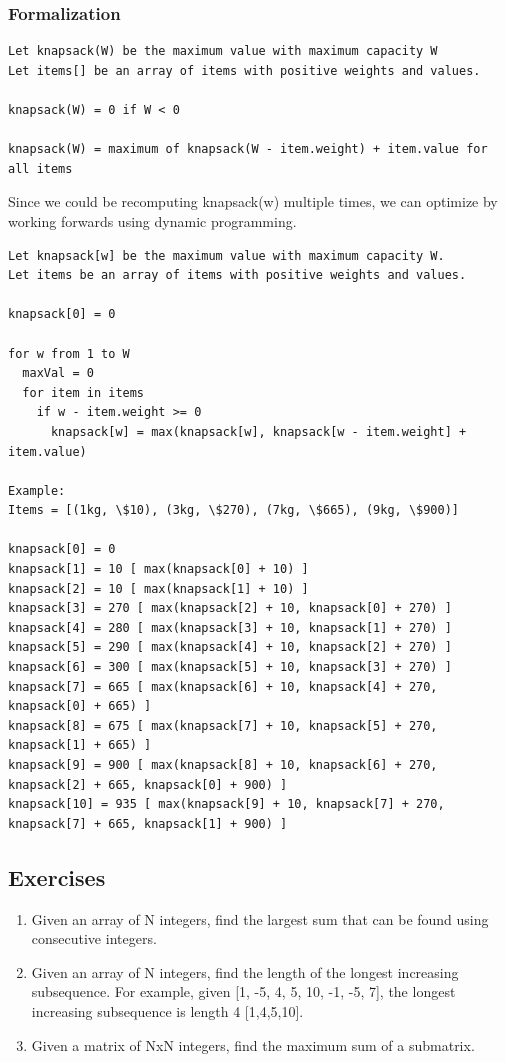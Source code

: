 \documentclass[11pt,oneside]{book}
\begin{document}
\subsubsection{Formalization}

\begin{lstlisting}
Let knapsack(W) be the maximum value with maximum capacity W
Let items[] be an array of items with positive weights and values.

knapsack(W) = 0 if W < 0

knapsack(W) = maximum of knapsack(W - item.weight) + item.value for all items
\end{lstlisting}

Since we could be recomputing knapsack(w) multiple times, we can optimize by working forwards using dynamic programming.

\begin{lstlisting}
Let knapsack[w] be the maximum value with maximum capacity W.
Let items be an array of items with positive weights and values.

knapsack[0] = 0

for w from 1 to W
  maxVal = 0
  for item in items
    if w - item.weight >= 0
      knapsack[w] = max(knapsack[w], knapsack[w - item.weight] + item.value)

Example:
Items = [(1kg, \$10), (3kg, \$270), (7kg, \$665), (9kg, \$900)]

knapsack[0] = 0
knapsack[1] = 10 [ max(knapsack[0] + 10) ]
knapsack[2] = 10 [ max(knapsack[1] + 10) ]
knapsack[3] = 270 [ max(knapsack[2] + 10, knapsack[0] + 270) ]
knapsack[4] = 280 [ max(knapsack[3] + 10, knapsack[1] + 270) ]
knapsack[5] = 290 [ max(knapsack[4] + 10, knapsack[2] + 270) ]
knapsack[6] = 300 [ max(knapsack[5] + 10, knapsack[3] + 270) ]
knapsack[7] = 665 [ max(knapsack[6] + 10, knapsack[4] + 270, knapsack[0] + 665) ]
knapsack[8] = 675 [ max(knapsack[7] + 10, knapsack[5] + 270, knapsack[1] + 665) ]
knapsack[9] = 900 [ max(knapsack[8] + 10, knapsack[6] + 270, knapsack[2] + 665, knapsack[0] + 900) ]
knapsack[10] = 935 [ max(knapsack[9] + 10, knapsack[7] + 270, knapsack[7] + 665, knapsack[1] + 900) ]
\end{lstlisting}

\subsection{Exercises}

\begin{enumerate}
\item Given an array of N integers, find the largest sum that can be found using consecutive integers.
\item Given an array of N integers, find the length of the longest increasing subsequence. For example, given [1, -5, 4, 5, 10, -1, -5, 7], the longest increasing subsequence is length 4 [1,4,5,10].
\item Given a matrix of NxN integers, find the maximum sum of a submatrix.
\end{enumerate}
\end{document}
